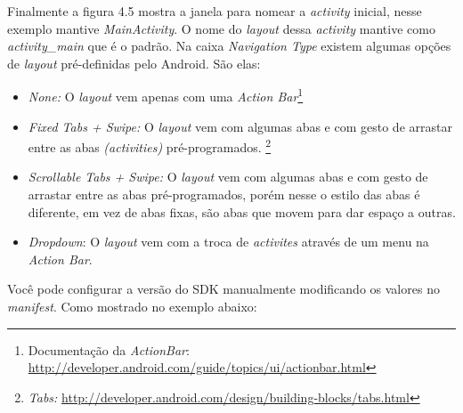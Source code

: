 \documentclass[a4paper,12pt,brazil]{book}
\begin{document}
Finalmente a figura 4.5 mostra a janela para nomear a \emph{activity} inicial, nesse exemplo mantive \emph{MainActivity}. O nome do \emph{layout} dessa \emph{activity} mantive como \emph{activity\_main} que é o padrão. Na caixa \emph{Navigation Type} existem algumas opções de \emph{layout} pré-definidas pelo Android. São elas:
\begin{itemize}[noitemsep, nolistsep]
\item
	\emph{None:} O \emph{layout} vem apenas com uma \emph{Action Bar}\footnote{Documentação da \emph{ActionBar}: \href{http://developer.android.com/guide/topics/ui/actionbar.html}{http://developer.android.com/guide/topics/ui/actionbar.html}}
\item
	\emph{Fixed Tabs + Swipe:} O \emph{layout} vem com algumas abas e com gesto de arrastar entre as abas \emph{(activities)} pré-programados.
	\footnote{\emph{Tabs:} \href{http://developer.android.com/design/building-blocks/tabs.html}{http://developer.android.com/design/building-blocks/tabs.html}}
\item
	\emph{Scrollable Tabs + Swipe:} O \emph{layout} vem com algumas abas e com gesto de arrastar entre as abas pré-programados, porém nesse o estilo das abas é diferente, em vez de abas fixas, são abas que movem para dar espaço a outras. 
\item
	\emph{Dropdown}: O \emph{layout} vem com a troca de \emph{activites} através de um menu na \emph{Action Bar}.  
\end{itemize}

Você pode configurar a versão do SDK manualmente modificando os valores no \emph{manifest}. Como mostrado no exemplo abaixo:
\end{document}

